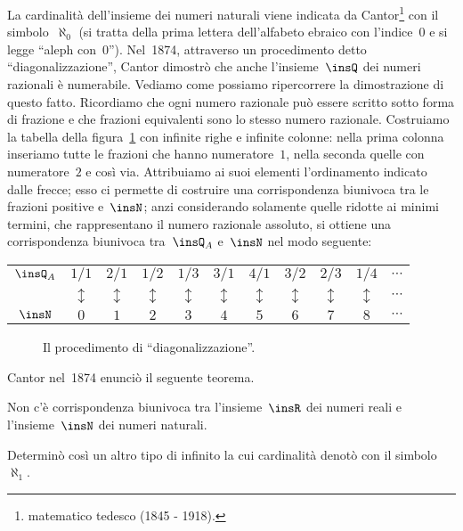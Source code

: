 La cardinalità dell'insieme dei numeri naturali viene indicata da Cantor\footnote{matematico tedesco (1845 - 1918).} con il simbolo~$\aleph_0$
(si tratta della prima lettera dell'alfabeto ebraico con l'indice~0 e si legge ``aleph con~0'').
Nel~1874, attraverso un procedimento detto ``diagonalizzazione'', Cantor dimostrò che anche l'insieme~$\insQ$
dei numeri razionali è numerabile. Vediamo come possiamo ripercorrere la dimostrazione di questo fatto.
Ricordiamo che ogni numero razionale può essere scritto sotto forma di frazione e che frazioni equivalenti
sono lo stesso numero razionale. Costruiamo la tabella della figura~\ref{fig:E.9} con infinite righe e infinite colonne:
nella prima colonna inseriamo tutte le frazioni che hanno numeratore~$1$, nella seconda quelle con numeratore~$2$ e così via.
Attribuiamo ai suoi elementi l'ordinamento indicato dalle frecce; esso ci permette di costruire una corrispondenza
biunivoca tra le frazioni positive e~$\insN$; anzi considerando solamente quelle ridotte ai minimi termini, che
rappresentano il numero razionale assoluto, si ottiene una corrispondenza biunivoca tra~$\insQ_A$ e~$\insN$ nel modo seguente:
\begin{center}
 \begin{tabular}{ccccccccccc}
  \toprule
  $\insQ_A$ & $1/1$ & $2/1$ & $1/2$ & $1/3$ & $3/1$ & $4/1$ & $3/2$ & $2/3$ & $1/4$ & $\cdots$\\
    & $\updownarrow$ & $\updownarrow$ & $\updownarrow$ & $\updownarrow$ & $\updownarrow$ & $\updownarrow$ & $\updownarrow$ & $\updownarrow$ & $\updownarrow$ & $\cdots$\\
  $\insN$ & $0$ & $1$ & $2$ & $3$ & $4$ & $5$ & $6$ & $7$ & $8$ & $\cdots$\\
  \bottomrule
 \end{tabular}
\end{center}

\begin{figure}[t]
 \centering
 \caption{Il procedimento di ``diagonalizzazione''.}\label{fig:E.9}
\end{figure}

Cantor nel~1874 enunciò il seguente teorema.

\begin{teorema}
 Non c'è corrispondenza biunivoca tra l'insieme~$\insR$ dei numeri reali e l'insieme~$\insN$ dei numeri naturali.
\end{teorema}

Determinò così un altro tipo di infinito la cui cardinalità denotò con il simbolo~$\aleph_1$.

